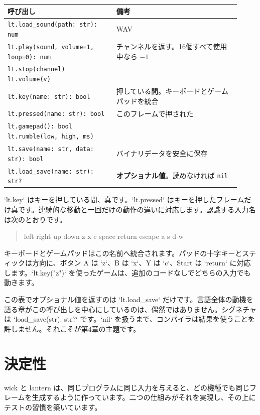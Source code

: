 \begin{center}
\small\begin{tabular}{@{}p{0.43\linewidth}p{0.49\linewidth}@{}}
\toprule
\textbf{呼び出し} & \textbf{備考} \\
\midrule
\texttt{lt.load\_sound(path: str): num} & WAV \\
\texttt{lt.play(sound, volume=1, loop=0): num} & チャンネルを返す。16個すべて使用中なら $-1$ \\
\texttt{lt.stop(channel)} \enskip \texttt{lt.volume(v)} & \\
\texttt{lt.key(name: str): bool} & 押している間。キーボードとゲームパッドを統合 \\
\texttt{lt.pressed(name: str): bool} & このフレームで押された \\
\texttt{lt.gamepad(): bool} \enskip \texttt{lt.rumble(low, high, ms)} & \\
\texttt{lt.save(name: str, data: str): bool} & バイナリデータを安全に保存 \\
\texttt{lt.load\_save(name: str): str?} & \textbf{オプショナル値}。読めなければ \texttt{nil} \\
\bottomrule
\end{tabular}
\end{center}

\noindent
`lt.key` はキーを押している間、真です。`lt.pressed` はキーを押したフレームだけ真です。連続的な移動と一回だけの動作の違いに対応します。認識する入力名は次のとおりです。

\begin{quote}
\ttfamily left right up down z x c space return escape a s d w
\end{quote}

\noindent
キーボードとゲームパッドはこの名前へ統合されます。パッドの十字キーとスティックは方向に、ボタン A は `z`、B は `x`、Y は `c`、Start は `return` に対応します。`lt.key("z")` を使ったゲームは、追加のコードなしでどちらの入力でも動きます。

この表でオプショナル値を返すのは `lt.load_save` だけです。言語全体の動機を語る章がこの呼び出しを中心にしているのは、偶然ではありません。シグネチャは `load_save(str): str?` です。`nil` を扱うまで、コンパイラは結果を使うことを許しません。それこそが第4章の主題です。

\section{決定性}

wick と lantern は、同じプログラムに同じ入力を与えると、どの機種でも同じフレームを生成するように作っています。二つの仕組みがそれを実現し、その上にテストの習慣を築いています。

